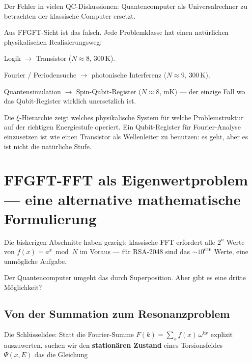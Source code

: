 \begin{keypoint}
Der Fehler in vielen QC-Diskussionen:
Quantencomputer als Universalrechner zu betrachten
der klassische Computer ersetzt.

Aus FFGFT-Sicht ist das falsch.
Jede Problemklasse hat einen natürlichen
physikalischen Realisierungsweg:

Logik $\to$ Transistor ($N \approx 8$, 300\,K).

Fourier / Periodensuche $\to$ photonische Interferenz
($N \approx 9$, 300\,K).

Quantensimulation $\to$ Spin-Qubit-Register
($N \approx 8$, mK) --- der einzige Fall wo
das Qubit-Register wirklich unersetzlich ist.

Die $\xi$-Hierarchie zeigt welches physikalische
System für welche Problemstruktur auf der
richtigen Energiestufe operiert.
Ein Qubit-Register für Fourier-Analyse einzusetzen
ist wie einen Transistor als Wellenleiter zu benutzen:
es geht, aber es ist nicht die natürliche Stufe.
\end{keypoint}

\section{FFGFT-FFT als Eigenwertproblem ---
  eine alternative mathematische Formulierung}
\label{sec:ffgft-eigen}

Die bisherigen Abschnitte haben gezeigt: klassische FFT
erfordert alle $2^n$ Werte von $f(x) = a^x \bmod N$
im Voraus --- für RSA-2048 sind das $\sim 10^{616}$ Werte,
eine unmögliche Aufgabe.

Der Quantencomputer umgeht das durch Superposition.
Aber gibt es eine dritte Möglichkeit?

\subsection{Von der Summation zum Resonanzproblem}

Die Schlüsselidee: Statt die Fourier-Summe
$F(k) = \sum_x f(x)\,\omega^{kx}$ explizit auszuwerten,
suchen wir den \textbf{stationären Zustand}
eines Torsionsfeldes $\Psi(x, E)$ das die Gleichung

